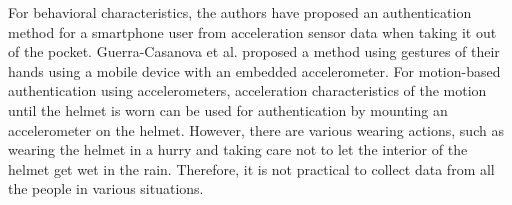 \documentclass[sigchi,authordraft]{acmart}
\begin{document}
For behavioral characteristics, the authors have proposed an authentication method for a smartphone user from acceleration sensor data when taking it out of the pocket\cite{murao_screen_unlock}. Guerra-Casanova et al.\cite{accelerometer_authentification} proposed a method using gestures of their hands using a mobile device with an embedded accelerometer. For motion-based authentication using accelerometers, acceleration characteristics of the motion until the helmet is worn can be used for authentication by mounting an accelerometer on the helmet. However, there are various wearing actions, such as wearing the helmet in a hurry and taking care not to let the interior of the helmet get wet in the rain. Therefore, it is not practical to collect data from all the people in various situations.\par



\end{document}
